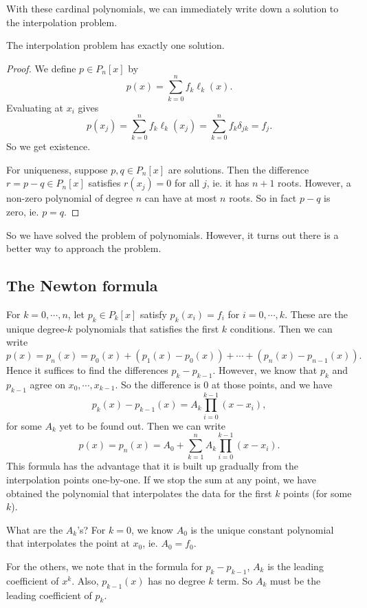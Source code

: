 \documentclass[a4paper]{article}
\begin{document}
With these cardinal polynomials, we can immediately write down a solution to the interpolation problem.
\begin{thm}
  The interpolation problem has exactly one solution.
\end{thm}

\begin{proof}
  We define $p \in P_n[x]$ by
  \[
    p(x) = \sum_{k = 0}^n f_k \ell_k (x).
  \]
  Evaluating at $x_i$ gives
  \[
    p(x_j) = \sum_{k = 0}^n f_k \ell_k(x_j) = \sum_{k = 0}^n f_k \delta_{jk} = f_j.
  \]
  So we get existence.

  For uniqueness, suppose $p, q \in P_n[x]$ are solutions. Then the difference $r = p - q \in P_n[x]$ satisfies $r(x_j) = 0$ for all $j$, ie. it has $n + 1$ roots. However, a non-zero polynomial of degree $n$ can have at most $n$ roots. So in fact $p - q$ is zero, ie. $p = q$.
\end{proof}
So we have solved the problem of polynomials. However, it turns out there is a better way to approach the problem.

\subsection{The Newton formula}
For $k = 0, \cdots, n$, let $p_k \in P_k[x]$ satisfy $p_k(x_i) = f_i$ for $i = 0, \cdots, k$. These are the unique degree-$k$ polynomials that satisfies the first $k$ conditions. Then we can write
\[
  p(x) = p_n(x) = p_0(x) + (p_1(x) - p_0(x)) + \cdots + (p_n(x) - p_{n - 1}(x)).
\]
Hence it suffices to find the differences $p_k - p_{k - 1}$. However, we know that $p_k$ and $p_{k - 1}$ agree on $x_0, \cdots, x_{k - 1}$. So the difference is $0$ at those points, and we have
\[
  p_k(x) - p_{k - 1}(x) = A_k \prod_{i = 0}^{k - 1}(x - x_i),
\]
for some $A_k$ yet to be found out. Then we can write
\[
  p(x) = p_n(x) = A_0 + \sum_{k = 1}^n A_k \prod_{i = 0}^{k - 1} (x - x_i).
\]
This formula has the advantage that it is built up gradually from the interpolation points one-by-one. If we stop the sum at any point, we have obtained the polynomial that interpolates the data for the first $k$ points (for some $k$).

What are the $A_k$'s? For $k = 0$, we know $A_0$ is the unique constant polynomial that interpolates the point at $x_0$, ie. $A_0 = f_0$.

For the others, we note that in the formula for $p_k - p_{k - 1}$, $A_k$ is the leading coefficient of $x^k$. Also, $p_{k - 1}(x)$ has no degree $k$ term. So $A_k$ must be the leading coefficient of $p_k$.
\end{document}
